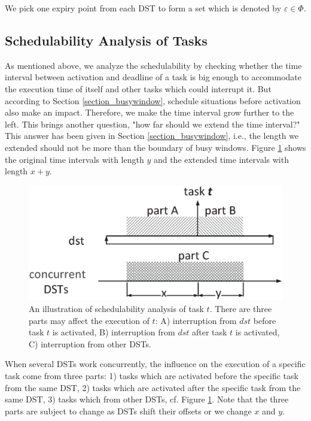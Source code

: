 \documentclass[sigconf]{acmart}
\begin{document}
We pick one expiry point from each DST to form a set which is denoted by $\varepsilon\in\Phi$.
\subsection{Schedulability Analysis of Tasks}
As mentioned above, we analyze the schedulability by checking whether the time interval between activation and deadline of a task is big enough to accommodate the execution time of itself and other tasks which could interrupt it. But according to Section \ref{section_busywindow}, schedule situations before activation also make an impact. Therefore, we make the time interval grow further to the left. This brings another question, "how far should we extend the time interval?" This answer has been given in Section \ref{section_busywindow}, i.e., the length we extended should not be more than the boundary of busy windows. Figure \ref{figure_3parts} shows the original time intervals with length $y$ and the extended time intervals with length $x+y$.
\begin{figure}
  \centering
  \includegraphics[scale=0.3]{graphics/figure_3parts.eps}
  \caption{An illustration of schedulability analysis of task $t$. There are three parts may affect the execution of $t$: A) interruption from $dst$ before task $t$ is activated, B) interruption from $dst$ after task $t$ is activated, C) interruption from other DSTs.}
  \label{figure_3parts}
\end{figure}

When several DSTs work concurrently, the influence on the execution of a specific task come from three parts: 1) tasks which are activated before the specific task from the same DST, 2) tasks which are activated after the specific task from the same DST, 3) tasks which from other DSTs, cf. Figure \ref{figure_3parts}. Note that the three parts are subject to change as DSTs shift their offsets or we change $x$ and $y$.
\end{document}
